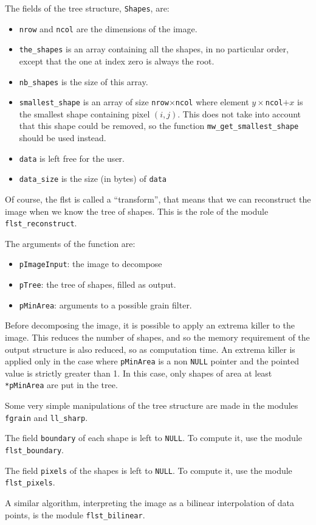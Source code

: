 The fields of the tree structure, \texttt{Shapes}, are:
\begin{itemize}
\item \texttt{nrow} and \texttt{ncol} are the dimensions of the image.
\item \texttt{the\_shapes} is an array containing all the shapes, in no
particular order, except that the one at index zero is always the root.
\item \texttt{nb\_shapes} is the size of this array.
\item \texttt{smallest\_shape} is an array of size
\texttt{nrow}$\times$\texttt{ncol} where element $y\times$\texttt{ncol}$+x$
is the smallest shape containing pixel $(i,j)$. This does not take into
account that this shape could be removed, so the function
\texttt{mw\_get\_smallest\_shape} should be used instead.
\item \texttt{data} is left free for the user.
\item \texttt{data\_size} is the size (in bytes) of \texttt{data}
\end{itemize}

Of course, the flst is called a ``transform'', that means that we can
reconstruct the image when we know the tree of shapes. This is the role of the
module \texttt{flst\_reconstruct}.

The arguments of the function are:
\begin{itemize}
\item \texttt{pImageInput}: the image to decompose
\item \texttt{pTree}: the tree of shapes, filled as output.
\item \texttt{pMinArea}: arguments to a possible grain filter.
\end{itemize}

Before decomposing the image, it is possible to apply an extrema killer to the
image. This reduces the number of shapes, and so the memory requirement of the
output structure is also reduced, so as computation time. An extrema killer is
applied only in the case where \texttt{pMinArea} is a non \texttt{NULL}
pointer and the pointed value is strictly greater than 1. In this case, only
shapes of area at least \texttt{*pMinArea} are put in the tree.

Some very simple manipulations of the tree structure are made in the modules
\texttt{fgrain} and \texttt{ll\_sharp}.

The field \texttt{boundary} of each shape is left to \texttt{NULL}. To compute
it, use the module \texttt{flst\_boundary}.

The field \texttt{pixels} of the shapes is left to \texttt{NULL}. To compute
it, use the module \texttt{flst\_pixels}.

A similar algorithm, interpreting the image as a bilinear interpolation of
data points, is the module \texttt{flst\_bilinear}.

